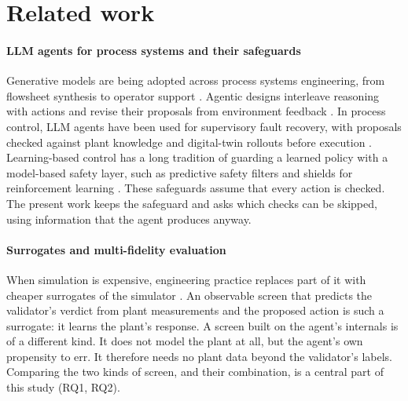 \section{Related work}\label{sec:related}

\paragraph{LLM agents for process systems and their safeguards}
Generative models are being adopted across process systems engineering, from flowsheet synthesis to operator
support \citep{decardinelson2024genai}. Agentic designs interleave reasoning with actions and revise their
proposals from environment feedback \citep{yao2023react,shinn2023reflexion}. In process control, LLM agents have
been used for supervisory fault recovery, with proposals checked against plant knowledge and digital-twin
rollouts before execution \citep{vyas2024agentic,car_todo}. Learning-based control has a long tradition of
guarding a learned policy with a model-based safety layer, such as predictive safety filters
\citep{wabersich2021safety} and shields for reinforcement learning \citep{alshiekh2018shielding}. These
safeguards assume that every action is checked. The present work keeps the safeguard and asks which checks can
be skipped, using information that the agent produces anyway.

\paragraph{Surrogates and multi-fidelity evaluation}
When simulation is expensive, engineering practice replaces part of it with cheaper surrogates of the simulator
\citep{forrester2009surrogate}. An observable screen that predicts the validator's verdict from plant
measurements and the proposed action is such a surrogate: it learns the plant's response. A screen built on the
agent's internals is of a different kind. It does not model the plant at all, but the agent's own propensity to
err. It therefore needs no plant data beyond the validator's labels. Comparing the two kinds of screen, and
their combination, is a central part of this study (RQ1, RQ2).

